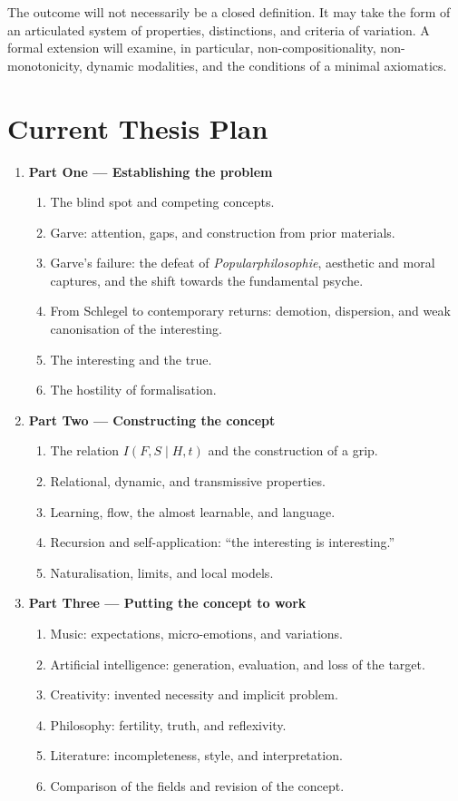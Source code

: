 \documentclass[11pt,a4paper]{article}
\begin{document}
The outcome will not necessarily be a closed definition. It may take the form
of an articulated system of properties, distinctions, and criteria of
variation. A formal extension will examine, in particular,
non-compositionality, non-monotonicity, dynamic modalities, and the conditions
of a minimal axiomatics.

\section{Current Thesis Plan}

\begin{enumerate}
  \item \textbf{Part One --- Establishing the problem}
    \begin{enumerate}
      \item The blind spot and competing concepts.
      \item Garve: attention, gaps, and construction from prior materials.
      \item Garve's failure: the defeat of \emph{Popularphilosophie}, aesthetic
            and moral captures, and the shift towards the fundamental psyche.
      \item From Schlegel to contemporary returns: demotion, dispersion, and
            weak canonisation of the interesting.
      \item The interesting and the true.
      \item The hostility of formalisation.
    \end{enumerate}
  \item \textbf{Part Two --- Constructing the concept}
    \begin{enumerate}
      \item The relation \(I(F,S\mid H,t)\) and the construction of a grip.
      \item Relational, dynamic, and transmissive properties.
      \item Learning, flow, the almost learnable, and language.
      \item Recursion and self-application: ``the interesting is interesting.''
      \item Naturalisation, limits, and local models.
    \end{enumerate}
  \item \textbf{Part Three --- Putting the concept to work}
    \begin{enumerate}
      \item Music: expectations, micro-emotions, and variations.
      \item Artificial intelligence: generation, evaluation, and loss of the
            target.
      \item Creativity: invented necessity and implicit problem.
      \item Philosophy: fertility, truth, and reflexivity.
      \item Literature: incompleteness, style, and interpretation.
      \item Comparison of the fields and revision of the concept.
    \end{enumerate}
\end{enumerate}
\end{document}
